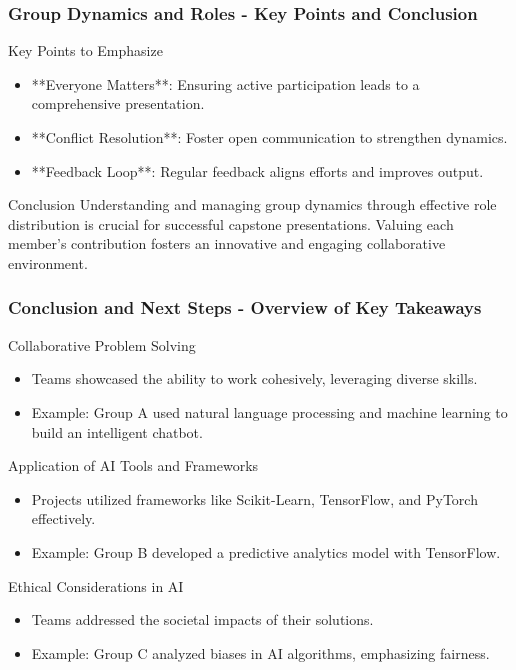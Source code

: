\documentclass[aspectratio=169]{beamer}
\begin{document}
\begin{frame}[fragile]
    \frametitle{Group Dynamics and Roles - Key Points and Conclusion}
    
    \begin{block}{Key Points to Emphasize}
        \begin{itemize}
            \item **Everyone Matters**: Ensuring active participation leads to a comprehensive presentation.
            \item **Conflict Resolution**: Foster open communication to strengthen dynamics.
            \item **Feedback Loop**: Regular feedback aligns efforts and improves output.
        \end{itemize}
    \end{block}
    
    \begin{block}{Conclusion}
        Understanding and managing group dynamics through effective role distribution is crucial for successful capstone presentations. Valuing each member's contribution fosters an innovative and engaging collaborative environment.
    \end{block}    

\end{frame}

\begin{frame}[fragile]
    \frametitle{Conclusion and Next Steps - Overview of Key Takeaways}
    
    \begin{block}{Collaborative Problem Solving}
        \begin{itemize}
            \item Teams showcased the ability to work cohesively, leveraging diverse skills.
            \item Example: Group A used natural language processing and machine learning to build an intelligent chatbot.
        \end{itemize}
    \end{block}
    
    \begin{block}{Application of AI Tools and Frameworks}
        \begin{itemize}
            \item Projects utilized frameworks like Scikit-Learn, TensorFlow, and PyTorch effectively.
            \item Example: Group B developed a predictive analytics model with TensorFlow.
        \end{itemize}
    \end{block}
    
    \begin{block}{Ethical Considerations in AI}
        \begin{itemize}
            \item Teams addressed the societal impacts of their solutions.
            \item Example: Group C analyzed biases in AI algorithms, emphasizing fairness.
        \end{itemize}
    \end{block}
\end{frame}
\end{document}
